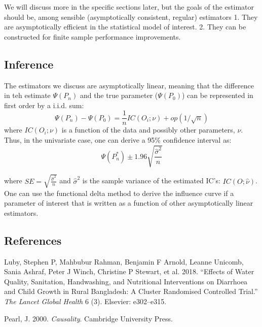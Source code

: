 \documentclass[]{article}
\begin{document}
We will discuss more in the specific sections later, but the goals of
the estimator should be, among sensible (asymptotically consistent,
regular) estimators 1. They are asymptotically efficient in the
statistical model of interest. 2. They can be constructed for finite
sample performance improvements.

\hypertarget{inference}{%
\subsection{Inference}\label{inference}}

The estimators we discuss are asymptotically linear, meaning that the
difference in teh estimate \(\Psi(P_n)\) and the true parameter
(\(\Psi(P_0)\)) can be represented in first order by a i.i.d. sum:
\begin{equation}
\label{IC}
\Psi(P_n) - \Psi(P_0) = \frac{1}{n} IC(O_i; \nu)+op(1/\sqrt{n})
\end{equation} where \(IC(O_i; \nu)\) is a function of the data and
possibly other parameters, \(\nu\). Thus, in the univariate case, one
can derive a 95\% confidence interval as: \begin{equation}
\label{CI}
\Psi(P^*_n) \pm 1.96 \sqrt{\frac{\hat{\sigma}^2}{n}}
\end{equation}

where \(SE=\sqrt{\frac{\hat{\sigma}^2}{n}}\) and \(\hat{\sigma}^2\) is
the sample variance of the estimated IC's: \(IC(O;\hat{\nu})\). One can
use the functional delta method to derive the influence curve if a
parameter of interest that is written as a function of other
asymptotically linear estimators.

\hypertarget{references}{%
\subsection*{References}\label{references}}

\hypertarget{refs}{}
\leavevmode\hypertarget{ref-luby2018effects}{}%
Luby, Stephen P, Mahbubur Rahman, Benjamin F Arnold, Leanne Unicomb,
Sania Ashraf, Peter J Winch, Christine P Stewart, et al. 2018. ``Effects
of Water Quality, Sanitation, Handwashing, and Nutritional Interventions
on Diarrhoea and Child Growth in Rural Bangladesh: A Cluster Randomised
Controlled Trial.'' \emph{The Lancet Global Health} 6 (3). Elsevier:
e302--e315.

\leavevmode\hypertarget{ref-pearl_causality_2000}{}%
Pearl, J. 2000. \emph{Causality}. Cambridge University Press.
\end{document}

